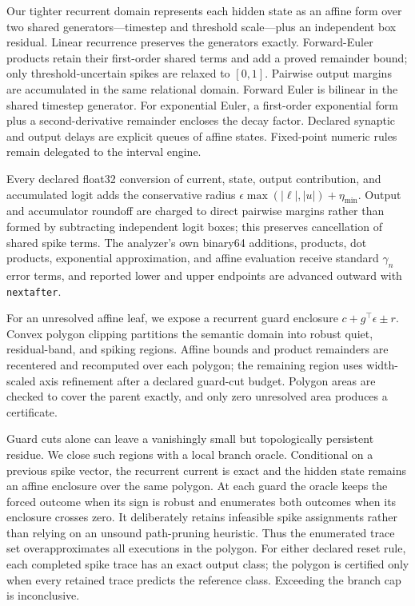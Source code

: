 Our tighter recurrent domain represents each hidden state as an affine form over
two shared generators---timestep and threshold scale---plus an independent box
residual. Linear recurrence preserves the generators exactly. Forward-Euler
products retain their first-order shared terms and add a proved remainder bound;
only threshold-uncertain spikes are relaxed to $[0,1]$. Pairwise output margins
are accumulated in the same relational domain. Forward Euler is bilinear in the
shared timestep generator. For exponential Euler, a first-order exponential
form plus a second-derivative remainder encloses the decay factor. Declared
synaptic and output delays are explicit queues of affine states. Fixed-point
numeric rules remain delegated to the interval engine.

Every declared float32 conversion of current, state, output contribution, and
accumulated logit adds the conservative radius
$\epsilon\max(|\ell|,|u|)+\eta_{\min}$. Output and accumulator roundoff are
charged to direct pairwise margins rather than formed by subtracting independent
logit boxes; this preserves cancellation of shared spike terms. The analyzer's
own binary64 additions, products, dot products, exponential approximation, and
affine evaluation receive standard $\gamma_n$ error terms, and reported lower
and upper endpoints are advanced outward with \texttt{nextafter}.

For an unresolved affine leaf, we expose a recurrent guard enclosure
$c+g^\top\epsilon\pm r$. Convex polygon clipping partitions the semantic domain
into robust quiet, residual-band, and spiking regions. Affine bounds and product
remainders are recentered and recomputed over each polygon; the remaining region
uses width-scaled axis refinement after a declared guard-cut budget. Polygon
areas are checked to cover the parent exactly, and only zero unresolved area
produces a certificate.

Guard cuts alone can leave a vanishingly small but topologically persistent
residue.  We close such regions with a local branch oracle.  Conditional on a
previous spike vector, the recurrent current is exact and the hidden state
remains an affine enclosure over the same polygon.  At each guard the oracle
keeps the forced outcome when its sign is robust and enumerates both outcomes
when its enclosure crosses zero.  It deliberately retains infeasible spike
assignments rather than relying on an unsound path-pruning heuristic.  Thus the
enumerated trace set overapproximates all executions in the polygon. For either
declared reset rule, each completed spike trace has an exact output class; the
polygon is certified only when every retained trace predicts the reference
class. Exceeding the branch cap is inconclusive.

